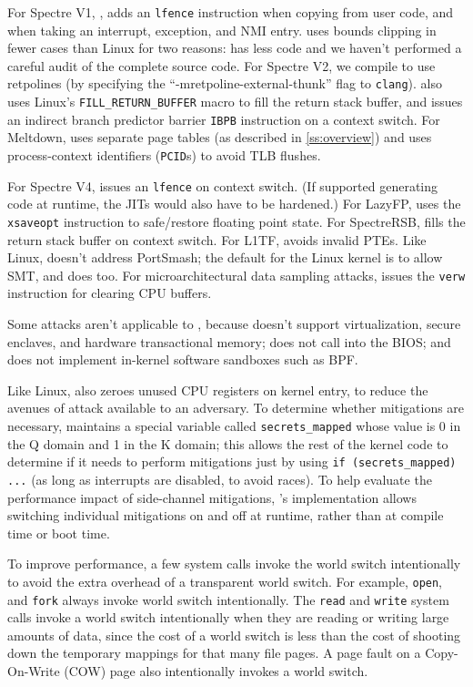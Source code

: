 For Spectre V1, \sys, adds an \texttt{lfence} instruction when copying
from user code, and when taking an interrupt, exception, and NMI entry.
\sys uses bounds clipping in fewer cases than Linux for two reasons:
\sys has less code and we haven't performed a careful audit of the
complete source code.  For Spectre V2, we compile \sys to use retpolines
(by specifying the ``-mretpoline-external-thunk'' flag to \texttt{clang}). \sys
also uses Linux's \texttt{FILL\_RETURN\_BUFFER} macro to fill the
return stack buffer, and issues an indirect branch predictor barrier
\texttt{IBPB} instruction on a context switch. For Meltdown, \sys uses
separate page tables (as described in \autoref{ss:overview}) and uses
process-context identifiers (\texttt{PCID}s) to avoid TLB flushes.

For Spectre V4, \sys issues an \texttt{lfence} on context switch. (If
\sys supported generating code at runtime, the JITs would also have to
be hardened.)  For LazyFP, \sys uses the \texttt{xsaveopt}
instruction to safe/restore floating point state.  For SpectreRSB,
\sys fills the return stack buffer on context switch.  For L1TF, \sys
avoids invalid PTEs. Like Linux, \sys doesn't address PortSmash; the
default for the Linux kernel is to allow SMT, and \sys does too.  For
microarchitectural data sampling attacks, \sys issues the
\texttt{verw} instruction for clearing CPU buffers.

Some attacks aren't applicable to \sys, because \sys doesn't support
virtualization, secure enclaves, and hardware transactional memory;
does not call into the BIOS; and does not implement in-kernel software
sandboxes such as BPF.

Like Linux, \sys also zeroes unused CPU registers on kernel entry, to
reduce the avenues of attack available to an adversary.  To determine
whether mitigations are necessary, \sys maintains a special variable
called \texttt{secrets\_mapped} whose value is 0 in the Q domain and 1 in
the K domain; this allows the rest of the kernel code to determine if it
needs to perform mitigations just by using \texttt{if (secrets\_mapped)
...} (as long as interrupts are disabled, to avoid races).  To help
evaluate the performance impact of side-channel mitigations, \sys's
implementation allows switching individual mitigations on and off at
runtime, rather than at compile time or boot time.

To improve performance, a few system calls invoke the world switch
intentionally to avoid the extra overhead of a transparent world switch.
For example, \texttt{open}, and \texttt{fork} always
invoke world switch intentionally.  The \texttt{read} and \texttt{write}
system calls invoke a world switch intentionally when they are reading
or writing large amounts of data, since the cost of a world switch is
less than the cost of shooting down the temporary mappings for that many
file pages.  A page fault on a Copy-On-Write (COW) page also intentionally
invokes a world switch.


